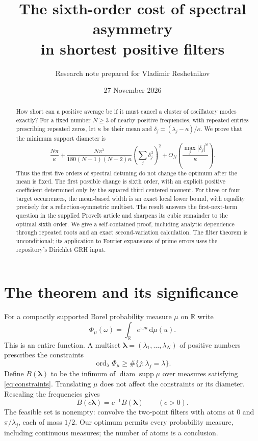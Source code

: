 \documentclass[11pt,a4paper]{article}
\title{The sixth-order cost of spectral asymmetry\\in shortest positive filters}
\author{Research note prepared for Vladimir Reshetnikov}
\date{27 November 2026}
\theoremstyle{remark}\newtheorem{remark}[theorem]{Remark}
\newcommand{\R}{\mathbb R}\newcommand{\C}{\mathbb C}
\newcommand{\dd}{\,\mathrm d}\newcommand{\ii}{\mathrm i}
\newcommand{\supp}{\operatorname{supp}}\newcommand{\diam}{\operatorname{diam}}
\newcommand{\ord}{\operatorname{ord}}\newcommand{\Res}{\operatorname{Res}}
\begin{document}
\maketitle
\begin{abstract}
How short can a positive average be if it must cancel a cluster of oscillatory modes exactly? For a fixed number $N\ge3$ of nearby positive frequencies, with repeated entries prescribing repeated zeros, let $\kappa$ be their mean and $\delta_j=(\lambda_j-\kappa)/\kappa$. We prove that the minimum support diameter is
\[
 \frac{N\pi}{\kappa}
 +\frac{N\pi^5}{180(N-1)(N-2)\kappa}
       \left(\sum_j\delta_j^3\right)^2
 +O_N\!\left(\frac{\max_j|\delta_j|^8}{\kappa}\right).
\]
Thus the first five orders of spectral detuning do not change the optimum after the mean is fixed. The first possible change is sixth order, with an explicit positive coefficient determined only by the squared third centered moment. For three or four target occurrences, the mean-based width is an exact local lower bound, with equality precisely for a reflection-symmetric multiset. The result answers the first-next-term question in the supplied ProveIt article and sharpens its cubic remainder to the optimal sixth order. We give a self-contained proof, including analytic dependence through repeated roots and an exact second-variation calculation. The filter theorem is unconditional; its application to Fourier expansions of prime errors uses the repository's Dirichlet GRH input.
\end{abstract}

\section{The theorem and its significance}
For a compactly supported Borel probability measure $\mu$ on $\R$ write
\[
 \Phi_\mu(\omega)=\int_{\R}e^{\ii\omega u}\dd\mu(u).
\]
This is an entire function. A multiset $\boldsymbol\lambda=(\lambda_1,\ldots,\lambda_N)$ of positive numbers prescribes the constraints
\begin{equation}\label{eq:constraints}
 \ord_{\lambda}\Phi_\mu\ge\#\{j:\lambda_j=\lambda\}.
\end{equation}
Define $B(\boldsymbol\lambda)$ to be the infimum of $\diam\supp\mu$ over measures satisfying \eqref{eq:constraints}. Translating $\mu$ does not affect the constraints or its diameter. Rescaling the frequencies gives
\begin{equation}\label{eq:scale}
 B(c\boldsymbol\lambda)=c^{-1}B(\boldsymbol\lambda)\qquad(c>0).
\end{equation}
The feasible set is nonempty: convolve the two-point filters with atoms at $0$ and $\pi/\lambda_j$, each of mass $1/2$. Our optimum permits every probability measure, including continuous measures; the number of atoms is a conclusion.
\end{document}
